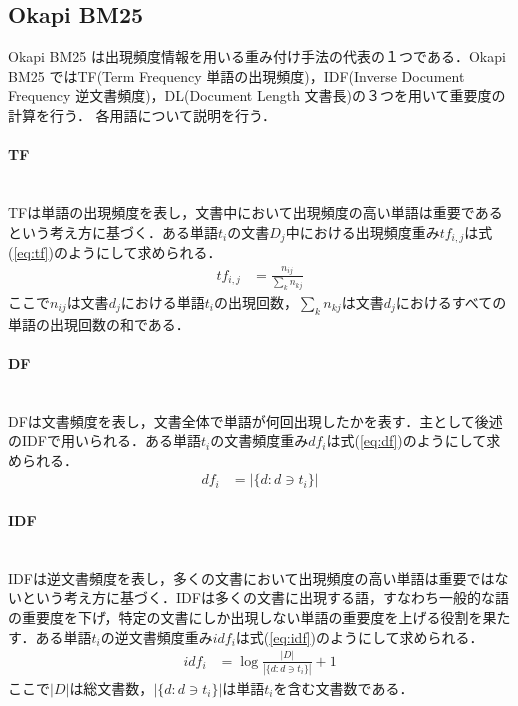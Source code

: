 \subsection{Okapi BM25}
Okapi BM25\cite{okapiBM25} は出現頻度情報を用いる重み付け手法の代表の１つである．Okapi BM25 ではTF(Term Frequency 単語の出現頻度)\cite{tf}，IDF(Inverse Document Frequency 逆文書頻度)\cite{idf}，DL(Document Length 文書長)の３つを用いて重要度の計算を行う．
各用語について説明を行う．
\paragraph{TF}\ \\
TFは単語の出現頻度を表し，文書中において出現頻度の高い単語は重要であるという考え方に基づく．ある単語$t_i$の文書$D_j$中における出現頻度重み$tf_{i,j}$は式(\ref{eq:tf})のようにして求められる．
\begin{equation}
\begin{aligned}
\label{eq:tf}
tf_{i,j} & = \frac{n_{ij}}{ \sum_{k} n_{kj} }
\end{aligned}
\end{equation}
ここで$n_{ij}$は文書$d_{j}$における単語$t_{i}$の出現回数，$\sum _{k} n_{kj} $は文書$d_{j}$におけるすべての単語の出現回数の和である．
\paragraph{DF}\ \\
DFは文書頻度を表し，文書全体で単語が何回出現したかを表す．主として後述のIDFで用いられる．ある単語$t_i$の文書頻度重み$df_{i}$は式(\ref{eq:df})のようにして求められる．
\begin{equation}
\begin{aligned}
\label{eq:df}
df_{i} & =  | \{ d: d \ni t_i \}  |
\end{aligned}
\end{equation}

\paragraph{IDF}\ \\
IDFは逆文書頻度を表し，多くの文書において出現頻度の高い単語は重要ではないという考え方に基づく．IDFは多くの文書に出現する語，すなわち一般的な語の重要度を下げ，特定の文書にしか出現しない単語の重要度を上げる役割を果たす．ある単語$t_i$の逆文書頻度重み$idf_{i}$は式(\ref{eq:idf})のようにして求められる．
\begin{equation}
\begin{aligned}
\label{eq:idf}
idf_{i} & = \log{ \frac{ |D| }{ | \{ d: d \ni t_i \}  |} }+1 %
\end{aligned}
\end{equation}
ここで$|D|$は総文書数，$| \{ d: d \ni t_i \}  |$は単語$t_i$を含む文書数である．
